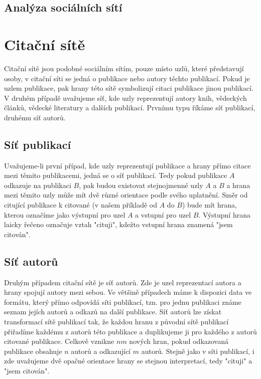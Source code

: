 \documentclass[12pt,titlepage]{report}
\begin{document}
\subsection{Analýza sociálních sítí}

\section{Citační sítě}
Citační sítě jsou podobné sociálním sítím, pouze místo uzlů, které představují
osoby, v citační síti se jedná o publikace nebo autory těchto publikací.  Pokud
je uzlem publikace, pak hrany této sítě symbolizují citaci publikace jinou
publikací. V druhém případě uvažujeme síť, kde uzly reprezentují autory knih,
vědeckých článků, vědecké literatury a dalších publikací. Prvnímu typu říkáme
síť publikací, druhému síť autorů.

\subsection{Síť publikací}
Uvažujeme-li první případ, kde uzly reprezentují publikace a hrany přímo citace
mezi těmito publikacemi, jedná se o síť publikací. Tedy pokud publikace $A$
odkazuje na publikaci $B$, pak budou existovat stejnojmenné uzly $A$ a $B$ a
hrana mezi těmito uzly může mít dvě různé orientace podle svého uplatnění. Směr
od citující publikace k citované (v našem příkladě od $A$ do $B$) bude mít
hrana, kterou označíme jako výstupní pro uzel $A$ a vstupní pro uzel $B$.
Výstupní hrana laicky řečeno označuje vztah "cituji", kdežto vstupní hrana
znamená "jsem citován".

\subsection{Síť autorů}
Druhým případem citační sítě je síť autorů. Zde je uzel reprezentací autora a
hrany spojují autory mezi sebou. Ve většině případech máme k dispozici data ve
formátu, který přímo odpovídá síti publikací, tzn. pro jednu publikaci známe
seznam jejích autorů a odkazů na další publikace. Síť autorů lze získat
transformací sítě publikací tak, že každou hranu z původní sítě publikací
přiřadíme každému z autorů této publikace a duplikujeme ji pro každého z autorů
citované publikace. Celkově vznikne $nm$ nových hran, pokud odkazovaná
publikace obsahuje $n$ autorů a odkazující $m$ autorů. Stejně jako v síti
publikací, i zde uvažujeme dvě opačné orientace hrany se stejnou interpretací,
tedy "cituji" a "jsem citován". 
\end{document}
